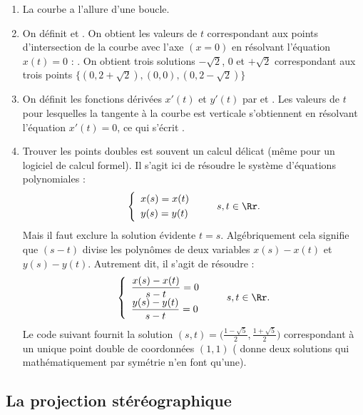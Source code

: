 \documentclass[class=report,crop=false]{standalone}
\begin{document}
\begin{enumerate}
  \item La courbe a l'allure d'une boucle.
  \item On définit  et .
On obtient les valeurs de $t$ correspondant aux points d'intersection de la courbe
avec l'axe $(x=0)$ en résolvant l'équation $x(t)=0$ : .
On obtient trois solutions $-\sqrt2$, $0$ et $+\sqrt2$ %
correspondant aux trois points
$\{(0,2+\sqrt2),(0,0),(0,2-\sqrt2)\}$
  
  \item On définit les fonctions dérivées $x'(t)$ et $y'(t)$
  par  et . 
  Les valeurs de $t$ pour lesquelles la tangente à la courbe est verticale s'obtiennent en résolvant
  l'équation $x'(t)=0$, ce qui s'écrit .
  
  \item Trouver les points doubles est souvent un calcul délicat (même pour un logiciel de calcul formel).
  Il s'agit ici de résoudre le système d'équations polynomiales :
   $$\left\{
  \begin{array}{l}
  x(s) =  x(t)\\[1mm]
  y(s) =  y(t)
  \end{array}
  \right.\qquad  s,t \in \Rr.$$ 
  Mais il faut exclure la solution évidente $t=s$. Algébriquement cela signifie
  que $(s-t)$ divise les polynômes de deux variables $x(s)-x(t)$ et
  $y(s)-y(t)$. Autrement dit, il s'agit de résoudre :
   $$\left\{
  \begin{array}{l}
  \dfrac{x(s)-x(t)}{s-t} = 0  \\[1mm]
  \dfrac{y(s)-y(t)}{s-t} = 0
  \end{array}
  \right.\qquad  s,t \in \Rr.$$   
  Le code suivant fournit la solution 
  $(s,t) = \big(\frac{1-\sqrt5}{2}, \frac{1+\sqrt5}{2}\big)$ correspondant à un unique 
  point double de coordonnées $(1,1)$ (\Sage{} donne deux solutions qui mathématiquement par symétrie n'en font qu'une).
\end{enumerate}



\subsection{La projection stéréographique}
\end{document}
